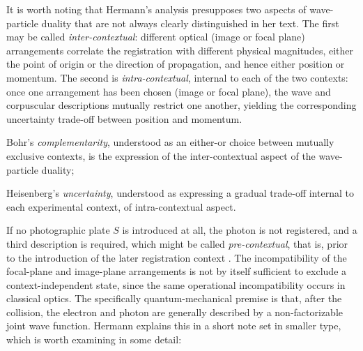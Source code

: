 \documentclass[final,12pt]{article}
\newcommand{\NGQ}[2]{\autocite[#1/#2]{Hermann1935}}
\begin{document}
%
It is worth noting that Hermann's analysis presupposes two aspects of wave-particle duality that are not always clearly distinguished in her text. The first may be called \emph{inter-contextual}: different optical (image or focal plane) arrangements correlate the registration with different physical magnitudes, either the point of origin or the direction of propagation, and hence either position or momentum. The second is \emph{intra-contextual}, internal to each of the two contexts: once one arrangement has been chosen (image or focal plane), the wave and corpuscular descriptions mutually restrict one another, yielding the corresponding uncertainty trade-off between position and momentum. \begin{inparaenum}[(a)] \item Bohr's \emph{complementarity}, understood as an either-or choice between mutually exclusive contexts, is the expression of the inter-contextual aspect of the wave-particle duality; \item Heisenberg's \emph{uncertainty}, understood as expressing a gradual trade-off internal to each experimental context, of intra-contextual aspect.
\end{inparaenum}


If no photographic plate $S$ is introduced at all, the photon is not registered, and a third description is required, which might be called \emph{pre-contextual}, that is, prior to the introduction of the later registration context \NGQ{135}{258}. The incompatibility of the focal-plane and image-plane arrangements is not by itself sufficient to exclude a context-independent state, since the same operational incompatibility occurs in classical optics. The specifically quantum-mechanical premise is that, after the collision, the electron and photon are generally described by a non-factorizable joint wave function. Hermann explains this in a short note set in smaller type, which is worth examining in some detail:
\end{document}
